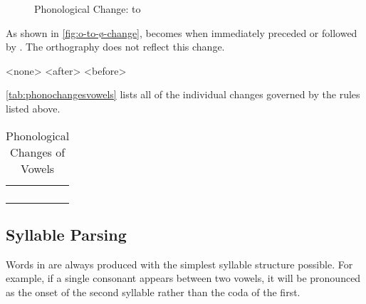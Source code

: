 \begin{figure}[h]\centering
	\caption{Phonological Change:  to }
	\label{fig:o-to-ø-change}
\end{figure}

As shown in \autoref{fig:o-to-ø-change},  becomes  when immediately preceded or followed by . The orthography does not reflect this change.

	\a<none>    
	\a<after>    
	\a<before>    
\xe

\autoref{tab:phonochangesvowels} lists all of the individual changes governed by the rules listed above.

\begin{table}\centering
	\caption{Phonological Changes of Vowels}
	\label{tab:phonochangesvowels}
	\begin{tabu} to \textwidth {l}
		\toprule %
		\\
		\\
		\\
		\midrule %
		\\
		\bottomrule
	\end{tabu}
\end{table}


\subsection{Syllable Parsing}
\label{sec:syllable-parsing}

Words in \lang{} are always produced with the simplest syllable structure possible. For example, if a single consonant appears between two vowels, it will be pronounced as the onset of the second syllable rather than the coda of the first.

